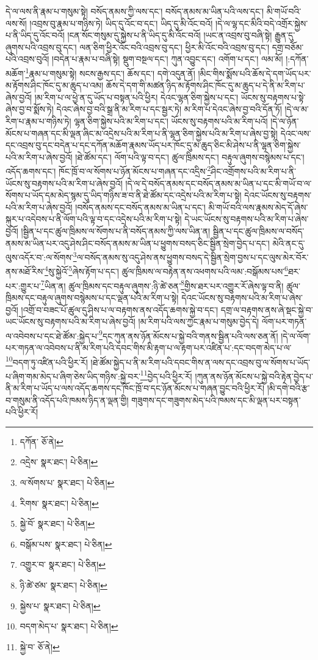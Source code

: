 དེ་ལ་ལས་ནི་རྣམ་པ་གསུམ་སྟེ། བསོད་ནམས་ཀྱི་ལས་དང་། བསོད་ནམས་མ་ཡིན་པའི་ལས་དང་། མི་གཡོ་བའི་ལས་སོ། །འབྲས་བུ་རྣམ་པ་གཉིས་ཏེ། ཡིད་དུ་འོང་བ་དང་། ཡིད་དུ་མི་འོང་བའོ། །དེ་ལ་ལྷ་དང་མིའི་བདེ་འགྲོར་སྐྱེས་པ་ནི་ཡིད་དུ་འོང་བའོ། །ངན་སོང་གསུམ་དུ་སྐྱེས་པ་ནི་ཡིད་དུ་མི་འོང་བའོ། །ཡང་ན་འབྲས་བུ་བཞི་སྟེ། རྒྱུན་དུ་ཞུགས་པའི་འབྲས་བུ་དང་། ལན་ཅིག་ཕྱིར་འོང་བའི་འབྲས་བུ་དང་། ཕྱིར་མི་འོང་བའི་འབྲས་བུ་དང་། དགྲ་བཅོམ་པའི་འབྲས་བུའོ། །བདེན་པ་རྣམ་པ་བཞི་སྟེ། སྡུག་བསྔལ་དང་། ཀུན་འབྱུང་དང་། འགོག་པ་དང་། ལམ་མོ། །:དཀོན་མཆོག་\footnote{དཀོན་  ཅོ་ནེ། }རྣམ་པ་གསུམ་སྟེ། སངས་རྒྱས་དང་། ཆོས་དང་། དགེ་འདུན་ནོ། །མིང་གིས་སྨོས་པའི་ཆོས་དེ་དག་ཡོད་པར་མ་རྟོགས་ཤིང་ཁོང་དུ་མ་ཆུད་པ་འམ། ཆོས་དེ་དག་གི་མཚན་ཉིད་མ་རྟོགས་ཤིང་ཁོང་དུ་མ་ཆུད་པ་དེ་ནི་མ་རིག་པ་ཞེས་བྱའོ། །མ་རིག་པ་ལ་ཕྱེ་ན་དུ་ཡོད་པ་བསྟན་པའི་ཕྱིར། དེའང་ལྷན་ཅིག་སྐྱེས་པ་དང་། ཡོངས་སུ་བརྟགས་པ་སྟེ་ཞེས་བྱ་བ་སྨོས་ཏེ། དེའང་ཞེས་བྱ་བའི་སྒྲ་ནི་མ་རིག་པ་དང་སྦྱར་ཏེ། མ་རིག་པ་དེའང་ཞེས་བྱ་བའི་དོན་ཏོ། །དེ་ལ་མ་རིག་པ་རྣམ་པ་གཉིས་ཏེ། ལྷན་ཅིག་སྐྱེས་པའི་མ་རིག་པ་དང་། ཡོངས་སུ་བརྟགས་པའི་མ་རིག་པའོ། །དེ་ལ་ཉོན་མོངས་པ་གཞན་དང་མི་ལྡན་ཞིང་མ་འདྲེས་པའི་མ་རིག་པ་ནི་ལྷན་ཅིག་སྐྱེས་པའི་མ་རིག་པ་ཞེས་བྱ་སྟེ། དེའང་ལས་དང་འབྲས་བུ་དང་བདེན་པ་དང་དཀོན་མཆོག་རྣམས་ཡོད་པར་ཁོང་དུ་མ་ཆུད་ཅིང་མི་ཤེས་པ་ནི་ལྷན་ཅིག་སྐྱེས་པའི་མ་རིག་པ་ཞེས་བྱའོ། །ཐེ་ཚོམ་དང་། ལོག་པའི་ལྟ་བ་དང་། ཚུལ་ཁྲིམས་དང་། བརྟུལ་ཞུགས་བསྙེམས་པ་དང་། འདོད་ཆགས་དང་། ཁོང་ཁྲོ་བ་ལ་སོགས་པ་ཉོན་མོངས་པ་གཞན་དང་འདྲིས་\footnote{འདྲེས་  སྣར་ཐང་།  པེ་ཅིན། }ཤིང་འགྲོགས་པའི་མ་རིག་པ་ནི་ཡོངས་སུ་བརྟགས་པའི་མ་རིག་པ་ཞེས་བྱའོ། །དེ་ལ་དེ་བསོད་ནམས་དང་བསོད་ནམས་མ་ཡིན་པ་དང་མི་གཡོ་བ་ལ་སོགས་པ་ཡོད་དམ་མེད་སྙམ་དུ་ཡིད་གཉིས་ཟ་བ་ནི་ཐེ་ཚོམ་དང་འདྲེས་པའི་མ་རིག་པ་སྟེ། དེའང་ཡོངས་སུ་བརྟགས་པའི་མ་རིག་པ་ཞེས་བྱའོ། །བསོད་ནམས་དང་བསོད་ནམས་མ་ཡིན་པ་དང་། མི་གཡོ་བའི་ལས་རྣམས་མེད་དོ་ཞེས་སྐུར་པ་འདེབས་པ་ནི་ལོག་པའི་ལྟ་བ་དང་འདྲེས་པའི་མ་རིག་པ་སྟེ། དེ་ཡང་ཡོངས་སུ་བརྟགས་པའི་མ་རིག་པ་ཞེས་བྱའོ། །སྦྱིན་པ་དང་ཚུལ་ཁྲིམས་ལ་སོགས་པ་ནི་བསོད་ནམས་ཀྱི་ལས་ཡིན་ན། སྦྱིན་པ་དང་ཚུལ་ཁྲིམས་ལ་བསོད་ནམས་མ་ཡིན་པར་འདུ་ཤེས་ཤིང་བསོད་ནམས་མ་ཡིན་པ་ཕྱུགས་བསད་ཅིང་སྦྱིན་སྲེག་བྱེད་པ་དང་། མེའི་ནང་དུ་ལུས་འདོར་བ་:ལ་སོགས་\footnote{ལ་སོགས་པ་  སྣར་ཐང་།  པེ་ཅིན། }ལ་བསོད་ནམས་སུ་འདུ་ཤེས་ནས་ཕྱུགས་བསད་དེ་སྦྱིན་སྲེག་བྱས་པ་དང་ལུས་མེར་བོར་ནས་མཐོ་རིས་\footnote{རིགས་  སྣར་ཐང་།  པེ་ཅིན། }སུ་སྐྱེའོ་\footnote{སྐྱེ་བོ་  སྣར་ཐང་།  པེ་ཅིན། }ཞེས་རྟོག་པ་དང་། ཚུལ་ཁྲིམས་ལ་བརྟེན་ནས་འཕགས་པའི་ལམ་:བསྒོམས་པས་\footnote{བསྒོམ་པས་  སྣར་ཐང་།  པེ་ཅིན། }ཐར་པར་:གྱུར་པ་\footnote{འགྱུར་བ་  སྣར་ཐང་།  པེ་ཅིན། }ཡིན་ན། ཚུལ་ཁྲིམས་དང་བརྟུལ་ཞུགས་:ཉི་ཚེ་ཅན་\footnote{ཉི་ཚེ་ཙམ་  སྣར་ཐང་།  པེ་ཅིན། }གྱིས་ཐར་པར་འགྱུར་རོ་ཞེས་ལྟ་བ་ནི། ཚུལ་ཁྲིམས་དང་བརྟུལ་ཞུགས་བསྙེམས་པ་དང་ལྡན་པའི་མ་རིག་པ་སྟེ། དེའང་ཡོངས་སུ་བརྟགས་པའི་མ་རིག་པ་ཞེས་བྱའོ། །འགྲོ་བ་བཟང་པོ་ཚུལ་དུ་ཤིས་པ་ལ་བརྟགས་ནས་འདོད་ཆགས་སྐྱེ་བ་དང་། དགྲ་ལ་བརྟགས་ནས་ཞེ་སྡང་སྐྱེ་བ་ཡང་ཡོངས་སུ་བརྟགས་པའི་མ་རིག་པ་ཞེས་བྱའོ། །མ་རིག་པའི་ལས་ཀྱང་རྣམ་པ་གསུམ་བྱེད་དེ། ལོག་པར་གཏན་ལ་འབེབས་པ་དང་ཐེ་ཚོམ་:སྐྱེད་པ་\footnote{སྐྱེས་པ་  སྣར་ཐང་།  པེ་ཅིན། }དང་ཀུན་ནས་ཉོན་མོངས་པ་སྐྱེ་བའི་གནས་སྦྱིན་པའི་ལས་ཅན་ནོ། །དེ་ལ་ལོག་པར་གཏན་ལ་འབེབས་པ་ནི་མ་རིག་པའི་དབང་གིས་མི་རྟག་པ་ལ་རྟག་པར་འཛིན་པ་:དང་བདག་མེད་པ་ལ་\footnote{བདག་མེད་པ་  སྣར་ཐང་།  པེ་ཅིན། }བདག་ཏུ་འཛིན་པའི་ཕྱིར་རོ། །ཐེ་ཚོམ་སྐྱེད་པ་ནི་མ་རིག་པའི་དབང་གིས་ན་ལས་དང་འབྲས་བུ་ལ་སོགས་པ་ཡོད་པ་ཞིག་གམ་མེད་པ་ཞིག་ཅེས་ཡིད་གཉིས་:སྐྱེ་བར་\footnote{སྐྱེ་བ་  ཅོ་ནེ། }བྱེད་པའི་ཕྱིར་རོ། །ཀུན་ནས་ཉོན་མོངས་པ་སྐྱེ་བའི་རྟེན་བྱེད་པ་ནི་མ་རིག་པ་ཡོད་པ་ལས་འདོད་ཆགས་དང་ཁོང་ཁྲོ་བ་དང་ཉོན་མོངས་པ་གཞན་བྱུང་བའི་ཕྱིར་རོ། །མི་དགེ་བའི་རྩ་བ་གསུམ་ནི་འདོད་པའི་ཁམས་ཉིད་ན་ལྡན་གྱི། གཟུགས་དང་གཟུགས་མེད་པའི་ཁམས་དང་མི་ལྡན་པར་བསྟན་པའི་ཕྱིར་རོ། 